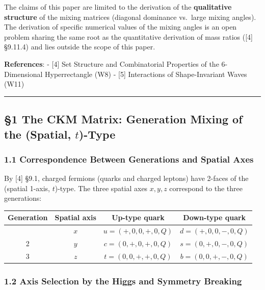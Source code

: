 \documentclass[
  a4paper,11pt]{article}
\newcounter{none} %
\begin{document}
The claims of this paper are limited to the derivation of the
\textbf{qualitative structure} of the mixing matrices (diagonal
dominance vs.~large mixing angles). The derivation of specific numerical
values of the mixing angles is an open problem sharing the same root as
the quantitative derivation of mass ratios ({[}4{]} §9.11.4) and lies
outside the scope of this paper.

\textbf{References}: - {[}4{]} Set Structure and Combinatorial
Properties of the 6-Dimensional Hyperrectangle (W8) - {[}5{]}
Interactions of Shape-Invariant Waves (W11)

\begin{center}\rule{0.5\linewidth}{0.5pt}\end{center}

\subsection{\texorpdfstring{§1 The CKM Matrix: Generation Mixing of the
(Spatial,
\(t\))-Type}{§1 The CKM Matrix: Generation Mixing of the (Spatial, t)-Type}}\label{the-ckm-matrix-generation-mixing-of-the-spatial-t-type}

\subsubsection{1.1 Correspondence Between Generations and Spatial
Axes}\label{correspondence-between-generations-and-spatial-axes}

By {[}4{]} §9.1, charged fermions (quarks and charged leptons) have
2-faces of the (spatial 1-axis, \(t\))-type. The three spatial axes
\(x, y, z\) correspond to the three generations:

{\def\LTcaptype{none} %
\begin{longtable}[]{@{}cccc@{}}
\toprule\noalign{}
Generation & Spatial axis & Up-type quark & Down-type quark \\
\midrule\noalign{}
\endhead
\bottomrule\noalign{}
\endlastfoot
1 & \(x\) & \(u = (+, 0, 0, +, 0, Q)\) & \(d = (+, 0, 0, -, 0, Q)\) \\
2 & \(y\) & \(c = (0, +, 0, +, 0, Q)\) & \(s = (0, +, 0, -, 0, Q)\) \\
3 & \(z\) & \(t = (0, 0, +, +, 0, Q)\) & \(b = (0, 0, +, -, 0, Q)\) \\
\end{longtable}
}

\subsubsection{1.2 Axis Selection by the Higgs and Symmetry
Breaking}\label{axis-selection-by-the-higgs-and-symmetry-breaking}
\end{document}
